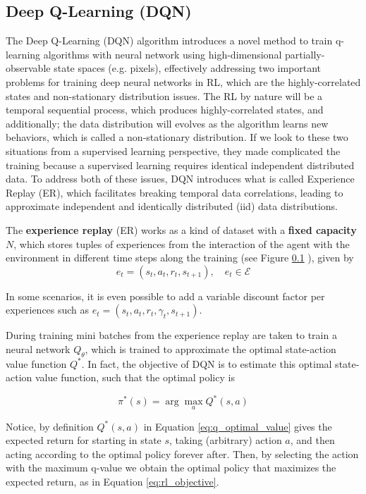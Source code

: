 \subsection{Deep Q-Learning (DQN)}
The Deep Q-Learning (DQN) \cite{mnih2013playing, mnih2015human} algorithm introduces a novel method to train q-learning algorithms with neural network using high-dimensional partially-observable state spaces (e.g. pixels), effectively addressing two important problems for training deep neural networks in RL, which are the highly-correlated states and non-stationary distribution issues. The RL by nature will be a temporal sequential process, which produces highly-correlated states, and additionally; the data distribution will evolves as the algorithm learns new behaviors, which is called a non-stationary distribution. If we look to these two situations from a supervised learning perspective, they made complicated the training because a supervised learning requires identical independent distributed data. To address both of these issues, DQN introduces what is called Experience Replay (ER), which facilitates breaking temporal data correlations, leading to approximate independent and identically distributed (iid) data distributions.

The \textbf{experience replay} (ER) works as a kind of dataset with a \textbf{fixed capacity} $N$, which stores tuples of experiences from the interaction of the agent with the environment in different time steps along the training (see Figure \ref{} ), given by 
$$e_t = (s_t, a_t, r_t, s_{t+1}), \quad e_t \in \mathcal{E}$$

In some scenarios, it is even possible to add a variable discount factor per experiences such as $e_t = (s_t, a_t, r_t, \gamma_t, s_{t+1})$.

During training mini batches from the experience replay are taken to train a neural network $Q_\theta$, which is trained to approximate the optimal state-action value function $Q^*$. In fact, the objective of DQN is to estimate this optimal state-action value function, such that the optimal policy is

\begin{equation}
    \pi^*(s) = \arg \max_a Q^* (s,a)
    \label{eq:optinal_q_policy}
\end{equation}

Notice, by definition $Q^*(s,a)$ in Equation \ref{eq:q_optimal_value} gives the expected return for starting in state $s$, taking (arbitrary) action $a$, and then acting according to the optimal policy forever after. Then, by selecting the action with the maximum q-value we obtain the optimal policy that maximizes the expected return, as in Equation \ref{eq:rl_objective}.

